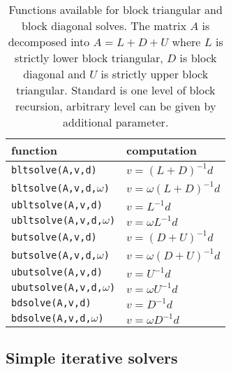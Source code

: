 \documentclass[11pt]{article}
\begin{document}
\begin{table}[htb]
\begin{center}
\begin{tabular}{|l|l|}
\hline
\textbf{function} & \textbf{computation}\\
\hline
\hline
\texttt{bltsolve(A,v,d)}  & $v=(L+D)^{-1}d$\\
\texttt{bltsolve(A,v,d,$\omega$)}  & $v=\omega(L+D)^{-1}d$\\
\texttt{ubltsolve(A,v,d)}  & $v=L^{-1}d$\\
\texttt{ubltsolve(A,v,d,$\omega$)}  & $v=\omega L^{-1}d$\\
\hline
\texttt{butsolve(A,v,d)}  & $v=(D+U)^{-1}d$\\
\texttt{butsolve(A,v,d,$\omega$)}  & $v=\omega(D+U)^{-1}d$\\
\texttt{ubutsolve(A,v,d)}  & $v=U^{-1}d$\\
\texttt{ubutsolve(A,v,d,$\omega$)}  & $v=\omega U^{-1}d$\\
\hline
\texttt{bdsolve(A,v,d)}  & $v=D^{-1}d$\\
\texttt{bdsolve(A,v,d,$\omega$)}  & $v=\omega D^{-1}d$\\
\hline
\end{tabular}
\end{center}

\caption{Functions available for block triangular and block diagonal
  solves. The matrix $A$ is decomposed into $A=L+D+U$ where $L$ is
  strictly lower block triangular, $D$ is block diagonal and $U$ is
  strictly upper block triangular. Standard is one level of block
  recursion, arbitrary level can be given by additional parameter.}
\label{Tab:TriangularSolves}
\end{table}

\subsection{Simple iterative solvers}
\end{document}

